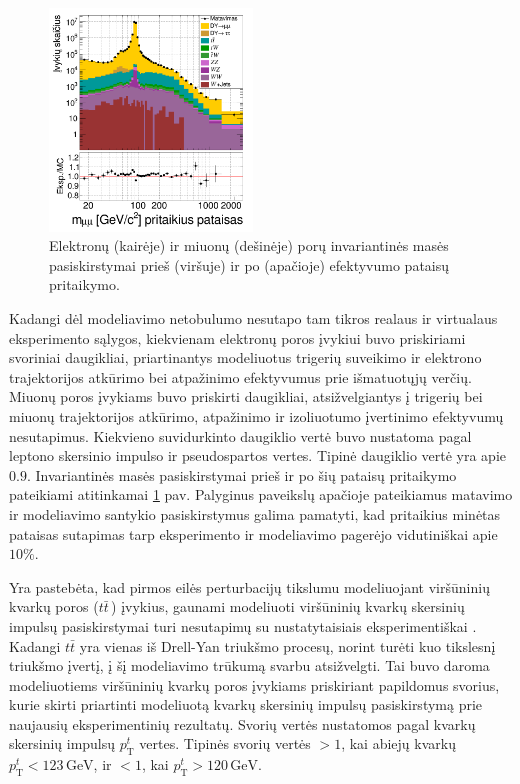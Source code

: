 \documentclass[a4paper, 12pt, twoside]{article}
\begin{document}
\begin{figure}[tbp]
	\includegraphics[width=0.48\textwidth]{mumu_mass_after.png}
	\caption{\label{fig:invMba} Elektronų (kairėje) ir miuonų (dešinėje) porų invariantinės masės pasiskirstymai
		prieš (viršuje) ir po (apačioje) efektyvumo pataisų pritaikymo.}
\end{figure}

Kadangi dėl modeliavimo netobulumo nesutapo tam tikros realaus ir virtualaus eksperimento sąlygos,
kiekvienam elektronų poros įvykiui buvo priskiriami svoriniai daugikliai, priartinantys modeliuotus trigerių
suveikimo ir elektrono trajektorijos atkūrimo bei atpažinimo efektyvumus prie išmatuotųjų verčių.
Miuonų poros įvykiams buvo priskirti daugikliai, atsižvelgiantys į trigerių bei miuonų trajektorijos atkūrimo,
atpažinimo ir izoliuotumo įvertinimo efektyvumų nesutapimus.
Kiekvieno suvidurkinto daugiklio vertė buvo nustatoma pagal leptono skersinio impulso ir pseudospartos vertes.
Tipinė daugiklio vertė yra apie $0.9$.
Invariantinės masės pasiskirstymai prieš ir po šių pataisų pritaikymo pateikiami atitinkamai \ref{fig:invMba} pav.
Palyginus paveikslų apačioje pateikiamus matavimo ir modeliavimo santykio pasiskirstymus galima pamatyti, kad
pritaikius minėtas pataisas sutapimas tarp eksperimento ir modeliavimo pagerėjo vidutiniškai apie $10\%$.

Yra pastebėta, kad pirmos eilės perturbacijų tikslumu modeliuojant viršūninių kvarkų poros ($t\bar{t}\,$)
įvykius, gaunami modeliuoti viršūninių kvarkų skersinių impulsų pasiskirstymai turi nesutapimų su nustatytaisiais
eksperimentiškai \cite{ttbarPT}.
Kadangi $t\bar{t}$ yra vienas iš Drell-Yan triukšmo procesų, norint turėti kuo tikslesnį triukšmo įvertį, į šį
modeliavimo trūkumą svarbu atsižvelgti.
Tai buvo daroma modeliuotiems viršūninių kvarkų poros įvykiams priskiriant papildomus svorius, kurie skirti
priartinti modeliuotą kvarkų skersinių impulsų pasiskirstymą prie naujausių eksperimentinių rezultatų.
Svorių vertės nustatomos pagal kvarkų skersinių impulsų $p_{\mathrm{T}}^{t}$ vertes.
Tipinės svorių vertės $>1$, kai abiejų kvarkų $p_{\mathrm{T}}^{t}<123 \, \mathrm{GeV}$, ir $<1$,
kai $p_{\mathrm{T}}^{t}>120 \, \mathrm{GeV}$.
\end{document}
